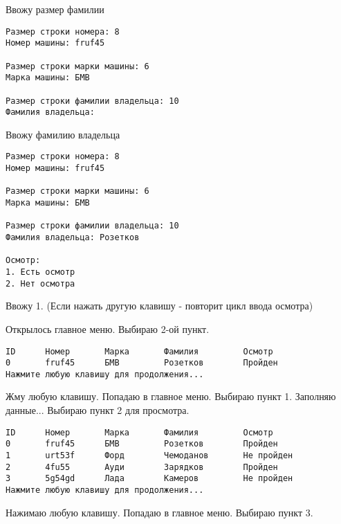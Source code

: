 Ввожу размер фамилии

\begin{tcolorbox}
\begin{verbatim}
Размер строки номера: 8
Номер машины: fruf45

Размер строки марки машины: 6
Марка машины: БМВ

Размер строки фамилии владельца: 10
Фамилия владельца:
\end{verbatim}
\end{tcolorbox}

Ввожу фамилию владельца

\begin{tcolorbox}
\begin{verbatim}
Размер строки номера: 8
Номер машины: fruf45

Размер строки марки машины: 6
Марка машины: БМВ

Размер строки фамилии владельца: 10
Фамилия владельца: Розетков

Осмотр:       
1. Есть осмотр
2. Нет осмотра
\end{verbatim}
\end{tcolorbox}

Ввожу 1. (Если нажать другую клавишу - повторит цикл ввода осмотра)

Открылось главное меню. Выбираю 2-ой пункт.

\begin{tcolorbox}
\begin{verbatim}
ID      Номер       Марка       Фамилия         Осмотр
0       fruf45      БМВ         Розетков        Пройден
Нажмите любую клавишу для продолжения...
\end{verbatim}
\end{tcolorbox}

Жму любую клавишу. Попадаю в главное меню. Выбираю пункт 1. Заполняю данные... Выбираю пункт 2 для просмотра.

\begin{tcolorbox}
\begin{verbatim}
ID      Номер       Марка       Фамилия         Осмотр
0       fruf45      БМВ         Розетков        Пройден
1       urt53f      Форд        Чемоданов       Не пройден
2       4fu55       Ауди        Зарядков        Пройден
3       5g54gd      Лада        Камеров         Не пройден
Нажмите любую клавишу для продолжения...   
\end{verbatim}
\end{tcolorbox}

Нажимаю любую клавишу. Попадаю в главное меню. Выбираю пункт 3.

